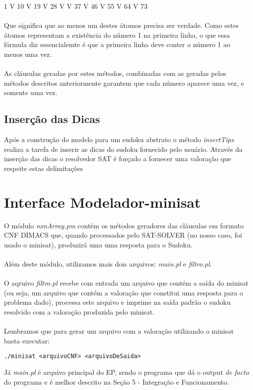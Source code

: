 \documentclass[a4paper]{article}
\begin{document}
1 V 10 V 19 V 28 V V 37 V 46 V 55 V 64 V 73\\\\
Que significa que ao menos um destes átomos precisa ser verdade. Como estes átomos representam a existência do número 1 na primeira linha, o que essa fórmula diz essencialemte é que a primeira linha deve conter o número 1 ao menos uma vez.\\\\
As cláusulas geradas por estes métodos, combinadas com as geradas pelos métodos descritos anteriormente garantem que cada número aparece uma vez, e somente uma vez.

\subsection{Inserção das Dicas}
Após a construção do modelo para um sudoku abstrato o método \textit{insertTips} realiza a tarefa de inserir as dicas do sudoku fornecido pelo usuário. Através da inserção das dicas o resolvedor SAT é forçado a fornecer uma valoração que respeite estas delimitações

\section{Interface Modelador-minisat}
O módulo \textit{nxnArray.pm} contém os métodos geradores das cláusulas em formato CNF DIMACS que, quando processados pelo SAT-SOLVER (no nosso caso, foi usado o minisat), produzirá uma uma resposta para o Sudoku.\\\\
Além deste módulo, utilizamos mais dois arquivos: \textit{main.pl} e \textit{filtro.pl}.\\\\
O aqruivo \textit{filtro.pl} recebe com entrada um arquivo que contém a saída do minisat (ou seja, um arquivo que contém a valoração que constitui uma resposta para o problema dado), processa este arquivo e imprime na saída padrão o sudoku resolvido com a valoração produzida pelo minisat.\\\\
Lembramos que para gerar um arquivo com a valoração utilizando o minisat basta executar:
\begin{verbatim}
./minisat <arquivoCNF> <arquivoDeSaida>
\end{verbatim}
Já \textit{main.pl} é arquivo principal do EP, sendo o programa que dá o output \textit{de facto} do programa e é melhor descrito na Seção 5 - Integração e Funcionamento.
\end{document}
